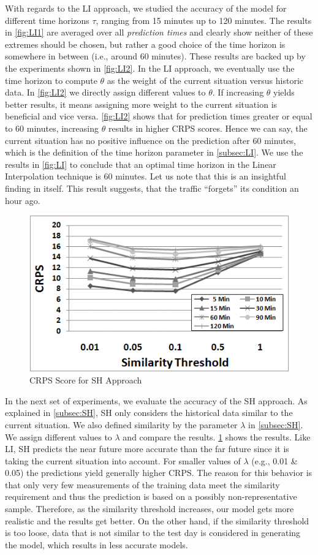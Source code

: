 With regards to the LI approach, we studied the accuracy of the model for
different time horizons $\tau$, ranging from 15 minutes up to 120 minutes. The
results in \cref{fig:LI1} are averaged over all \textit{prediction times} and
clearly show neither of these extremes should be chosen, but rather a good
choice of the time horizon is somewhere in between (i.e., around 60 minutes).
These results are backed up by the experiments shown in \cref{fig:LI2}. In the
LI approach, we eventually use the time horizon to compute $\theta$ as the
weight of the current situation versus historic data. In \cref{fig:LI2} we
directly assign different values to $\theta$. If increasing $\theta$ yields
better results, it means assigning more weight to the current situation is
beneficial and vice versa. \cref{fig:LI2} shows that for prediction times
greater or equal to 60 minutes, increasing $\theta$ results in higher CRPS
scores. Hence we can say, the current situation has no positive influence on the
prediction after 60 minutes, which is the definition of the time horizon
parameter in \cref{subsec:LI}. We use the results in \cref{fig:LI} to conclude
that an optimal time horizon in the Linear Interpolation technique is 60
minutes. Let us note that this is an insightful finding in itself. This result
suggests, that the traffic ``forgets'' its condition an hour ago.

\begin{figure}
	\centering
	\includegraphics[width = 0.6\columnwidth]{figures/Links_Filtered.png}
	\caption{CRPS Score for SH Approach}\label{fig:SH}
\end{figure}

In the next set of experiments, we evaluate the accuracy of the SH approach. As explained in \cref{subsec:SH}, SH only considers the historical data similar to the current situation. We also defined similarity by the parameter $\lambda$ in \cref{subsec:SH}. We assign different values to $\lambda$ and compare the results. \cref{fig:SH} shows the results. Like LI, SH predicts the near future more accurate than the far future since it is taking the current situation into account. For smaller values of $\lambda$ (e.g., 0.01 \& 0.05) the predictions yield generally higher CRPS. The reason for this behavior is that only very few measurements of the training data meet the similarity
requirement and thus the prediction is based on a possibly non-representative sample. Therefore, as the similarity threshold increases, our model gets more realistic and the results get better. On the other hand, if the similarity
threshold is too loose, data that is not similar to the test day is considered in generating the model, which results in less accurate models.

